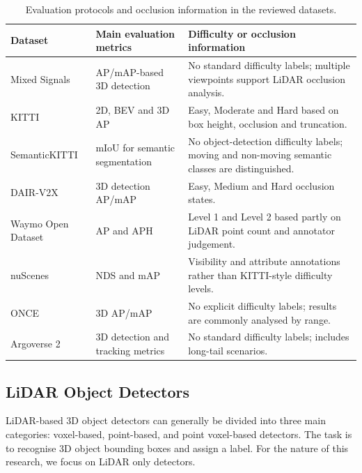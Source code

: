 \documentclass[12pt,a4paper]{article}
\begin{document}
\begin{table}[htbp]
    \centering
    \caption{Evaluation protocols and occlusion information in the reviewed datasets.}
    \label{tab:dataset-evaluation}
    \small
    \setlength{\tabcolsep}{3pt}
    \sloppy
    \renewcommand{\arraystretch}{1.15}
    \begin{tabularx}{\textwidth}{|p{2.5cm}|p{3.2cm}|Y|}
        \hline
        \textbf{Dataset} & \textbf{Main evaluation metrics} & \textbf{Difficulty or occlusion information} \\
        \hline
        Mixed Signals & AP/mAP-based 3D detection & No standard difficulty labels; multiple viewpoints support LiDAR occlusion analysis. \\
        \hline
        KITTI & 2D, BEV and 3D AP & Easy, Moderate and Hard based on box height, occlusion and truncation. \\
        \hline
        SemanticKITTI & mIoU for semantic segmentation & No object-detection difficulty labels; moving and non-moving semantic classes are distinguished. \\
        \hline
        DAIR-V2X & 3D detection AP/mAP & Easy, Medium and Hard occlusion states. \\
        \hline
        Waymo Open Dataset & AP and APH & Level 1 and Level 2 based partly on LiDAR point count and annotator judgement. \\
        \hline
        nuScenes & NDS and mAP & Visibility and attribute annotations rather than KITTI-style difficulty levels. \\
        \hline
        ONCE & 3D AP/mAP & No explicit difficulty labels; results are commonly analysed by range. \\
        \hline
        Argoverse 2 & 3D detection and tracking metrics & No standard difficulty labels; includes long-tail scenarios. \\
        \hline
    \end{tabularx}
\end{table}

\FloatBarrier

\subsection{LiDAR Object Detectors}

LiDAR-based 3D object detectors can generally be divided into three main
categories: voxel-based, point-based, and point voxel-based detectors.
The task is to recognise 3D object bounding boxes and assign a label.
For the nature of this research, we focus on LiDAR only detectors.
\end{document}

